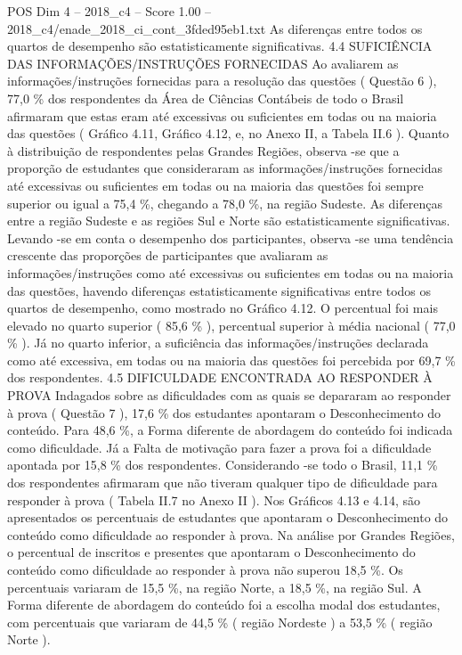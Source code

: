 \begin{textsample}{POS Dim 4 – 2018\_c4 – Score 1.00 – 2018\_c4/enade\_2018\_ci\_cont\_3fded95eb1.txt}
As diferenças entre todos os quartos de desempenho são estatisticamente significativas. 4.4 SUFICIÊNCIA DAS INFORMAÇÕES/INSTRUÇÕES FORNECIDAS Ao avaliarem as informações/instruções fornecidas para a resolução das questões ( Questão 6 ), 77,0 \% dos respondentes da Área de Ciências Contábeis de todo o Brasil afirmaram que estas eram até excessivas ou suficientes em todas ou na maioria das questões ( Gráfico 4.11, Gráfico 4.12, e, no Anexo II, a Tabela II.6 ).
Quanto à distribuição de respondentes pelas Grandes Regiões, observa -se que a proporção de estudantes que consideraram as informações/instruções fornecidas até excessivas ou suficientes em todas ou na maioria das questões foi sempre superior ou igual a 75,4 \%, chegando a 78,0 \%, na região Sudeste.
As diferenças entre a região Sudeste e as regiões Sul e Norte são estatisticamente significativas.
Levando -se em conta o desempenho dos participantes, observa -se uma tendência crescente das proporções de participantes que avaliaram as informações/instruções como até excessivas ou suficientes em todas ou na maioria das questões, havendo diferenças estatisticamente significativas entre todos os quartos de desempenho, como mostrado no Gráfico 4.12.
O percentual foi mais elevado no quarto superior ( 85,6 \% ), percentual superior à média nacional ( 77,0 \% ).
Já no quarto inferior, a suficiência das informações/instruções declarada como até excessiva, em todas ou na maioria das questões foi percebida por 69,7 \% dos respondentes. 4.5 DIFICULDADE ENCONTRADA AO RESPONDER À PROVA Indagados sobre as dificuldades com as quais se depararam ao responder à prova ( Questão 7 ), 17,6 \% dos estudantes apontaram o Desconhecimento do conteúdo.
Para 48,6 \%, a Forma diferente de abordagem do conteúdo foi indicada como dificuldade.
Já a Falta de motivação para fazer a prova foi a dificuldade apontada por 15,8 \% dos respondentes.
Considerando -se todo o Brasil, 11,1 \% dos respondentes afirmaram que não tiveram qualquer tipo de dificuldade para responder à prova ( Tabela II.7 no Anexo II ).
Nos Gráficos 4.13 e 4.14, são apresentados os percentuais de estudantes que apontaram o Desconhecimento do conteúdo como dificuldade ao responder à prova.
Na análise por Grandes Regiões, o percentual de inscritos e presentes que apontaram o Desconhecimento do conteúdo como dificuldade ao responder à prova não superou 18,5 \%.
Os percentuais variaram de 15,5 \%, na região Norte, a 18,5 \%, na região Sul.
A Forma diferente de abordagem do conteúdo foi a escolha modal dos estudantes, com percentuais que variaram de 44,5 \% ( região Nordeste ) a 53,5 \% ( região Norte ).

\end{textsample}
